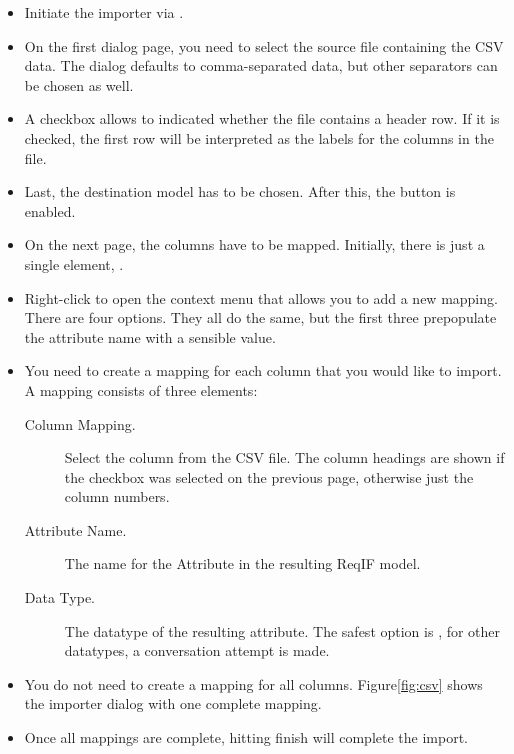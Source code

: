 \begin{itemize}
\item Initiate the importer via .  

\item On the first dialog page, you need to select the source file containing the CSV data. The dialog defaults to comma-separated data, but other separators can be chosen as well.

\item A checkbox allows to indicated whether the file contains a header row.  If it is checked, the first row will be interpreted as the labels for the columns in the file.

\item Last, the destination model has to be chosen.  After this, the  button is enabled.  

\item On the next page, the columns have to be mapped.  Initially, there is just a single element, .

\item Right-click  to open the context menu that allows you to add a new mapping.  There are four options.  They all do the same, but the first three prepopulate the attribute name with a sensible value.

\item You need to create a mapping for each column that you would like to import.  A mapping consists of three elements:

\begin{description}
\item[Column Mapping.] Select the column from the CSV file.  The column headings are shown if the checkbox was selected on the previous page, otherwise just the column numbers.
\item[Attribute Name.] The name for the Attribute in the resulting ReqIF model.
\item[Data Type.] The datatype of the resulting attribute.  The safest option is , for other datatypes, a conversation attempt is made.
\end{description}

\item You do not need to create a mapping for all columns.  Figure\ref{fig:csv} shows the importer dialog with one complete mapping.

\item  Once all mappings are complete, hitting finish will complete the import.

\end{itemize}

